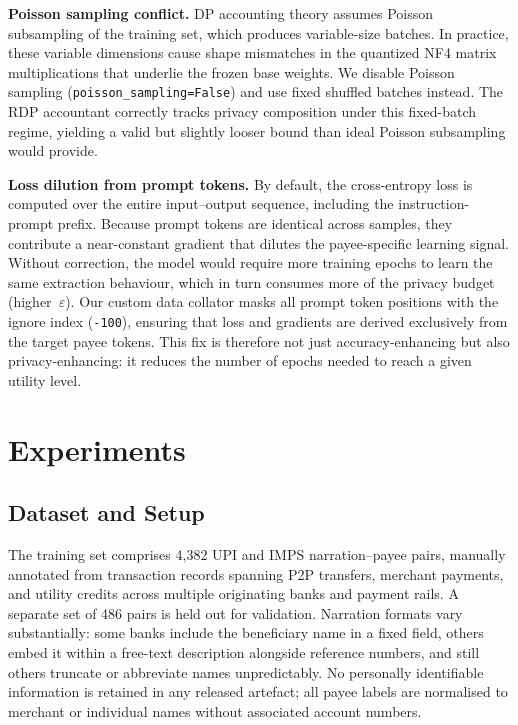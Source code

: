 \documentclass[conference]{IEEEtran}
\begin{document}
\textbf{Poisson sampling conflict.} DP accounting theory assumes Poisson subsampling of the training set, which produces variable-size batches. In practice, these variable dimensions cause shape mismatches in the quantized NF4 matrix multiplications that underlie the frozen base weights. We disable Poisson sampling (\texttt{poisson\_sampling=False}) and use fixed shuffled batches instead. The RDP accountant correctly tracks privacy composition under this fixed-batch regime, yielding a valid but slightly looser bound than ideal Poisson subsampling would provide.

\textbf{Loss dilution from prompt tokens.} By default, the cross-entropy loss is computed over the entire input--output sequence, including the instruction-prompt prefix. Because prompt tokens are identical across samples, they contribute a near-constant gradient that dilutes the payee-specific learning signal. Without correction, the model would require more training epochs to learn the same extraction behaviour, which in turn consumes more of the privacy budget (higher~$\varepsilon$). Our custom data collator masks all prompt token positions with the ignore index (\texttt{-100}), ensuring that loss and gradients are derived exclusively from the target payee tokens. This fix is therefore not just accuracy-enhancing but also privacy-enhancing: it reduces the number of epochs needed to reach a given utility level.

\section{Experiments}
\label{sec:exp}

\subsection{Dataset and Setup}

The training set comprises 4{,}382 UPI and IMPS narration--payee pairs, manually annotated from transaction records spanning P2P transfers, merchant payments, and utility credits across multiple originating banks and payment rails. A separate set of 486 pairs is held out for validation. Narration formats vary substantially: some banks include the beneficiary name in a fixed field, others embed it within a free-text description alongside reference numbers, and still others truncate or abbreviate names unpredictably. No personally identifiable information is retained in any released artefact; all payee labels are normalised to merchant or individual names without associated account numbers.
\end{document}
